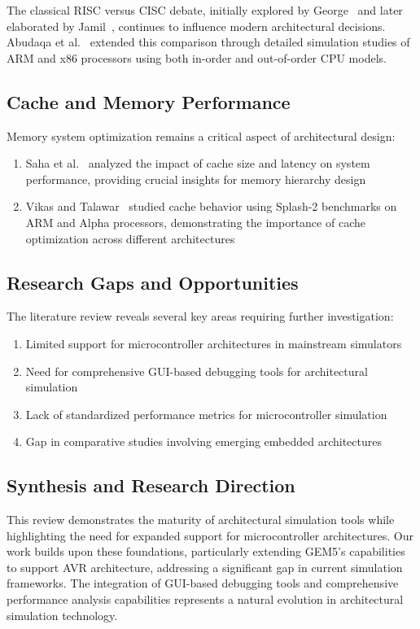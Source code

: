 The classical RISC versus CISC debate, initially explored by George~\cite{george1990overview} and later elaborated by Jamil~\cite{jamil1995risc}, continues to influence modern architectural decisions. Abudaqa et al.~\cite{abudaqa2018simulation} extended this comparison through detailed simulation studies of ARM and x86 processors using both in-order and out-of-order CPU models.

\subsection{Cache and Memory Performance}

Memory system optimization remains a critical aspect of architectural design:

\begin{enumerate}
    \item Saha et al.~\cite{saha2020impact} analyzed the impact of cache size and latency on system performance, providing crucial insights for memory hierarchy design
    \item Vikas and Talawar~\cite{vikas2014cache} studied cache behavior using Splash-2 benchmarks on ARM and Alpha processors, demonstrating the importance of cache optimization across different architectures
\end{enumerate}

\subsection{Research Gaps and Opportunities}

The literature review reveals several key areas requiring further investigation:

\begin{enumerate}
    \item Limited support for microcontroller architectures in mainstream simulators
    \item Need for comprehensive GUI-based debugging tools for architectural simulation
    \item Lack of standardized performance metrics for microcontroller simulation
    \item Gap in comparative studies involving emerging embedded architectures
\end{enumerate}

\subsection{Synthesis and Research Direction}

This review demonstrates the maturity of architectural simulation tools while highlighting the need for expanded support for microcontroller architectures. Our work builds upon these foundations, particularly extending GEM5's capabilities to support AVR architecture, addressing a significant gap in current simulation frameworks. The integration of GUI-based debugging tools and comprehensive performance analysis capabilities represents a natural evolution in architectural simulation technology.